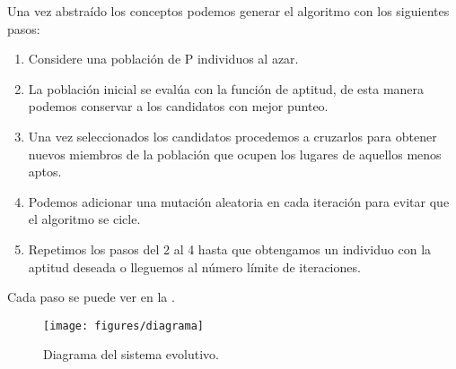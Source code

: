 \documentclass[10pt,twocolumn,a4paper]{articuloAPA}
\begin{document}

Una vez abstraído los conceptos podemos generar el algoritmo con los siguientes pasos:

\begin{enumerate}
  \item Considere una población de P individuos al azar.
  \item La población inicial se evalúa con la función de aptitud, de esta manera podemos conservar a los candidatos con mejor punteo.
  \item 	Una vez seleccionados los candidatos procedemos a cruzarlos para obtener nuevos miembros de la población que ocupen los lugares de aquellos menos aptos.
  \item Podemos adicionar una mutación aleatoria en cada iteración para evitar que el algoritmo se cicle.
  \item Repetimos los pasos del 2 al 4 hasta que obtengamos un individuo con la aptitud deseada o lleguemos al número límite de iteraciones.
\end{enumerate}

Cada paso se puede ver en la .

\begin{figure*}
  \centering
  \texttt{[image: figures/diagrama]}
  \decoRule
  \caption[Diagrama del sistema evolutivo. ]{Diagrama del sistema evolutivo.}
  \label{fig:diagrama}
\end{figure*}
\end{document}
